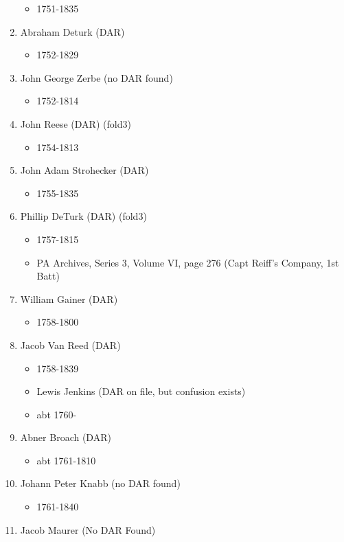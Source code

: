 \documentclass[11pt,letter]{book}
\begin{document}
\begin{enumerate}
\begin{itemize}
\item 1751-1835
\end{itemize}
\item Abraham Deturk (DAR)
\begin{itemize}
\item 1752-1829
\end{itemize}
\item John George Zerbe (no DAR found)
\begin{itemize}
\item 1752-1814
\end{itemize}
\item John Reese (DAR) (fold3)
\begin{itemize}
\item 1754-1813
\end{itemize}
\item John Adam Strohecker (DAR)
\begin{itemize}
\item 1755-1835
\end{itemize}
\item Phillip DeTurk (DAR) (fold3)
\begin{itemize}
\item 1757-1815
\item PA Archives, Series 3, Volume VI, page 276 (Capt Reiff's Company, 1st Batt)
\end{itemize}
\item William Gainer (DAR)
\begin{itemize}
\item 1758-1800
\end{itemize}
\item Jacob Van Reed (DAR)
\begin{itemize}
\item 1758-1839
\item Lewis Jenkins (DAR on file, but confusion exists)
\item abt 1760-
\end{itemize}
\item Abner Broach (DAR)
\begin{itemize}
\item abt 1761-1810
\end{itemize}
\item Johann Peter Knabb (no DAR found)
\begin{itemize}
\item 1761-1840
\end{itemize}
\item Jacob Maurer (No DAR Found)

\end{enumerate}
\end{document}
